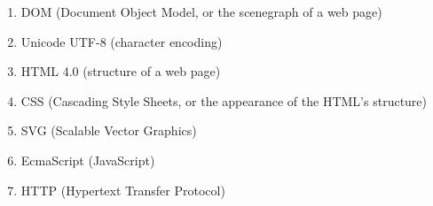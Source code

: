 \documentclass[a4paper, 11pt]{article} %
\begin{document}
\begin{itemize}
	\begin{enumerate}
		\item DOM (Document Object Model, or the scenegraph of a web page)
		\item Unicode UTF-8 (character encoding)
		\item HTML 4.0 (structure of a web page)
		\item CSS (Cascading Style Sheets, or the appearance of the HTML's structure)
		\item SVG (Scalable Vector Graphics)
		\item EcmaScript (JavaScript)
		\item HTTP (Hypertext Transfer Protocol)
	\end{enumerate}
	
\end{itemize}
\end{document}

